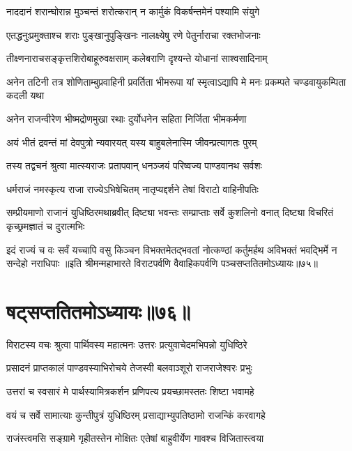 \twolineshloka
{नाददानं शरान्घोरान्न मुञ्चन्तं शरोत्करान्}
{न कार्मुकं विकर्षन्तमेनं पश्यामि संयुगे}


\twolineshloka
{एतद्धनुःप्रमुक्ताश्च शराः पुङ्खानुपुङ्खिनः}
{नालक्ष्येषु रणे पेतुर्नाराचा रक्तभोजनाः}


\twolineshloka
{तीक्ष्णनाराचसङ्कृत्तशिरोबाहूरुवक्षसाम्}
{कलेबराणि दृश्यन्ते योधानां साश्वसादिनाम्}


\threelineshloka
{अनेन तटिनी तत्र शोणिताम्बुप्रवाहिनी}
{प्रवर्तिता भीमरूपा यां स्मृत्वाऽद्यापि मे मनः}
{प्रकम्पते चण्डवायुकम्पिता कदली यथा}


\twolineshloka
{अनेन राजन्वीरेण भीष्मद्रोणमुखा रथाः}
{दुर्योधनेन सहिता निर्जिता भीमकर्मणा}


\twolineshloka
{अयं भीतं द्रवन्तं मां देवपुत्रो न्यवारयत्}
{यस्य बाहुबलेनास्मि जीवन्प्रत्यागतः पुरम्}



\twolineshloka
{तस्य तद्वचनं श्रुत्वा मात्स्यराजः प्रतापवान्}
{धनञ्जयं परिष्वज्य पाण्डवानथ सर्वशः}


\twolineshloka
{धर्मराजं नमस्कृत्य राजा राज्येऽभिषेचितम्}
{नातृप्यद्दर्शने तेषां विराटो वाहिनीपतिः}


\threelineshloka
{सम्प्रीयमाणो राजानं युधिष्ठिरमथाब्रवीत्}
{दिष्ट्या भवन्तः सम्प्राप्ताः सर्वे कुशलिनो वनात्}
{दिष्ट्या विचरितं कृच्छ्रमज्ञातं च दुरात्मभिः}


\threelineshloka
{इदं राज्यं च वः सर्वं यच्चापि वसु किञ्चन}
{विभक्तमेतद्भवतां नोत्कण्ठां कर्तुमर्हथ}
{अविभक्तं भवद्भिर्मे न सन्देहो नराधिपाः}
॥इति श्रीमन्महाभारते विराटपर्वणि वैवाहिकपर्वणि पञ्चसप्ततितमोऽध्यायः॥७५॥

\chapter{षट्सप्ततितमोऽध्यायः॥७६॥}

\twolineshloka
{विराटस्य वचः श्रुत्वा पार्थिवस्य महात्मनः}
{उत्तरः प्रत्युवाचेदमभिपन्नो युधिष्ठिरे}


\twolineshloka
{प्रसादनं प्राप्तकालं पाण्डवस्याभिरोचये}
{तेजस्वी बलवाञ्शूरो राजराजेश्वरः प्रभुः}


\twolineshloka
{उत्तरां च स्वसारं मे पार्थस्यामित्रकर्शन}
{प्रणिपत्य प्रयच्छामस्ततः शिष्टा भवामहे}



\twolineshloka
{वयं च सर्वे सामात्याः कुन्तीपुत्रं युधिष्ठिरम्}
{प्रसाद्याभ्युपतिष्ठामो राजन्किं करवागहे}


\twolineshloka
{राजंस्त्वमसि सङ्ग्रामे गृहीतस्तेन मोक्षितः}
{एतेषां बाहुवीर्येण गावश्च विजितास्त्वया}


